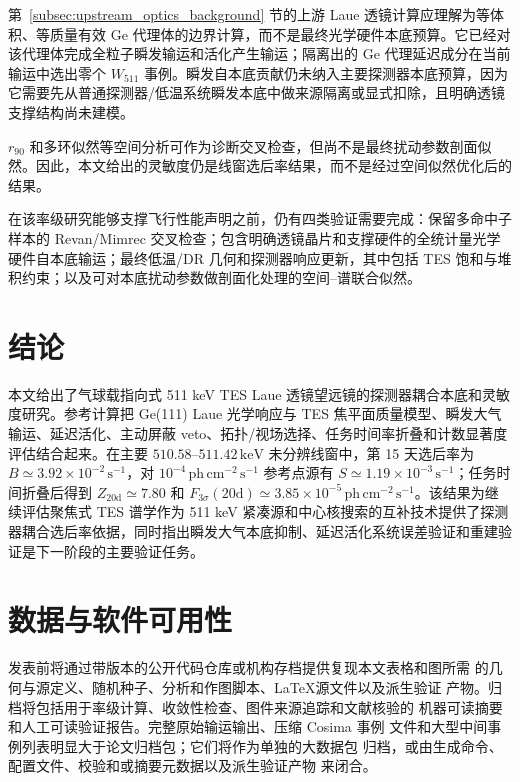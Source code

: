 \documentclass[preprint,12pt]{elsarticle}
\newcommand{\keV}{\,\mathrm{keV}}
\newcommand{\phcms}{\,\mathrm{ph\,cm^{-2}\,s^{-1}}}
\newcommand{\cps}{\,\mathrm{s^{-1}}}
\newcommand{\wii}{W_{511}}
\newcommand{\fthree}{F_{3\sigma}}
\begin{document}
第~\ref{subsec:upstream_optics_background} 节的上游 Laue 透镜计算应理解为等体积、等质量有效 Ge 代理体的边界计算，而不是最终光学硬件本底预算。它已经对该代理体完成全粒子瞬发输运和活化产生输运；隔离出的 Ge 代理延迟成分在当前输运中选出零个 $\wii$ 事例。瞬发自本底贡献仍未纳入主要探测器本底预算，因为它需要先从普通探测器/低温系统瞬发本底中做来源隔离或显式扣除，且明确透镜支撑结构尚未建模。

$r_{90}$ 和多环似然等空间分析可作为诊断交叉检查，但尚不是最终扰动参数剖面似然。因此，本文给出的灵敏度仍是线窗选后率结果，而不是经过空间似然优化后的结果。

在该率级研究能够支撑飞行性能声明之前，仍有四类验证需要完成：保留多命中子样本的 Revan/Mimrec 交叉检查；包含明确透镜晶片和支撑硬件的全统计量光学硬件自本底输运；最终低温/DR 几何和探测器响应更新，其中包括 TES 饱和与堆积约束；以及可对本底扰动参数做剖面化处理的空间--谱联合似然。

\section{结论}
\label{sec:conclusions}

本文给出了气球载指向式 511 keV TES Laue 透镜望远镜的探测器耦合本底和灵敏度研究。参考计算把 Ge(111) Laue 光学响应与 TES 焦平面质量模型、瞬发大气输运、延迟活化、主动屏蔽 veto、拓扑/视场选择、任务时间率折叠和计数显著度评估结合起来。在主要 $510.58$--$511.42\keV$ 未分辨线窗中，第 15 天选后率为 $B\simeq3.92\times10^{-2}\cps$，对 $10^{-4}\phcms$ 参考点源有 $S\simeq1.19\times10^{-3}\cps$；任务时间折叠后得到 $Z_{20\mathrm{d}}\simeq7.80$ 和 $\fthree(20\mathrm{d})\simeq3.85\times10^{-5}\phcms$。该结果为继续评估聚焦式 TES 谱学作为 511 keV 紧凑源和中心核搜索的互补技术提供了探测器耦合选后率依据，同时指出瞬发大气本底抑制、延迟活化系统误差验证和重建验证是下一阶段的主要验证任务。

\section*{数据与软件可用性}
发表前将通过带版本的公开代码仓库或机构存档提供复现本文表格和图所需
的几何与源定义、随机种子、分析和作图脚本、\LaTeX 源文件以及派生验证
产物。归档将包括用于率级计算、收敛性检查、图件来源追踪和文献核验的
机器可读摘要和人工可读验证报告。完整原始输运输出、压缩 Cosima 事例
文件和大型中间事例列表明显大于论文归档包；它们将作为单独的大数据包
归档，或由生成命令、配置文件、校验和或摘要元数据以及派生验证产物
来闭合。
\end{document}
